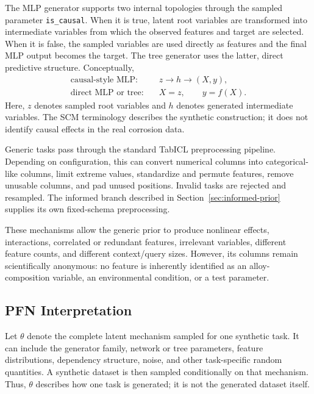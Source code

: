 \documentclass{article}
\begin{document}
The MLP generator supports two internal topologies through the sampled
parameter \texttt{is\_causal}. When it is true, latent root variables are
transformed into intermediate variables from which the observed features and
target are selected. When it is false, the sampled variables are used directly
as features and the final MLP output becomes the target. The tree generator
uses the latter, direct predictive structure. Conceptually,
\begin{equation}
\begin{aligned}
\text{causal-style MLP:}\quad &z\longrightarrow h\longrightarrow(X,y),\\
\text{direct MLP or tree:}\quad &X=z,\qquad y=f(X).
\end{aligned}
\label{eq:generic-generator-modes}
\end{equation}
Here, \(z\) denotes sampled root variables and \(h\) denotes generated
intermediate variables. The SCM terminology describes the synthetic
construction; it does not identify causal effects in the real corrosion data.

Generic tasks pass through the standard TabICL preprocessing pipeline.
Depending on configuration, this can convert numerical columns into
categorical-like columns, limit extreme values, standardize and permute
features, remove unusable columns, and pad unused positions. Invalid tasks are
rejected and resampled. The informed branch described in
Section~\ref{sec:informed-prior} supplies its own fixed-schema preprocessing.

These mechanisms allow the generic prior to produce nonlinear effects,
interactions, correlated or redundant features, irrelevant variables,
different feature counts, and different context/query sizes. However, its
columns remain scientifically anonymous: no feature is inherently identified
as an alloy-composition variable, an environmental condition, or a test
parameter.

\subsection{PFN Interpretation}

Let \(\theta\) denote the complete latent mechanism sampled for one synthetic
task. It can include the generator family, network or tree parameters, feature
distributions, dependency structure, noise, and other task-specific random
quantities. A synthetic dataset is then sampled conditionally on that
mechanism. Thus, \(\theta\) describes how one task is generated; it is not the
generated dataset itself.
\end{document}
